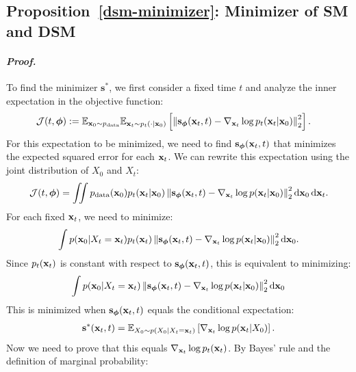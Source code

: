 \subsection{Proposition~\ref{dsm-minimizer}: Minimizer of SM and DSM}\label{app-sec:min-dsm}

\paragraph{\textit{Proof.}} To find the minimizer $\mathbf{s}^*$, we first consider a fixed time $t$ and analyze the inner expectation in the objective function:
\begin{align*}
\mathcal  J(t, \bm{\phi}) 
&:= \mathbb{E}_{{\mathbf{x}}_0 \sim p_{\text{data}}} 
\mathbb{E}_{{\mathbf{x}}_t \sim p_t(\cdot|{\mathbf{x}}_0)} 
\left[\left\| \mathbf{s}_{\bm{\phi}}({\mathbf{x}}_t, t) - \nabla_{{\mathbf{x}}_t} \log p_t({\mathbf{x}}_t|{\mathbf{x}}_0) \right\|_2^2 \right].
\end{align*}
For this expectation to be minimized, we need to find 
$\mathbf{s}_{\bm{\phi}}({\mathbf{x}}_t, t)$ 
that minimizes the expected squared error for each ${\mathbf{x}}_t$.
We can rewrite this expectation using the joint distribution of $X_0$ and $X_t$:
\begin{align*}
\mathcal J(t, \bm{\phi}) 
= \iint p_{\text{data}}({\mathbf{x}}_0) p_t({\mathbf{x}}_t |{\mathbf{x}}_0) 
\left\| \mathbf{s}_{\bm{\phi}}({\mathbf{x}}_t, t) - \nabla_{{\mathbf{x}}_t} \log p({\mathbf{x}}_t |  {\mathbf{x}}_0) \right\|_2^2 
 \mathop{}\!\mathrm{d}{\mathbf{x}}_0  \mathop{}\!\mathrm{d}{\mathbf{x}}_t.
\end{align*}
For each fixed ${\mathbf{x}}_t$, we need to minimize:
\begin{align*}
\int p({\mathbf{x}}_0 | X_t = {\mathbf{x}}_t) p_t( {\mathbf{x}}_t) 
\left\| \mathbf{s}_{\bm{\phi}}({\mathbf{x}}_t, t) - \nabla_{{\mathbf{x}}_t} \log p({\mathbf{x}}_t |  {\mathbf{x}}_0) \right\|_2^2 
 \mathop{}\!\mathrm{d}{\mathbf{x}}_0.
\end{align*}
Since $p_t({\mathbf{x}}_t)$ is constant with respect to 
$\mathbf{s}_{\bm{\phi}}({\mathbf{x}}_t, t)$, this is equivalent to minimizing:
\begin{align*}
\int p( {\mathbf{x}}_0 | X_t = {\mathbf{x}}_t) 
\left\| \mathbf{s}_{\bm{\phi}}({\mathbf{x}}_t, t) - \nabla_{{\mathbf{x}}_t} \log p({\mathbf{x}}_t |  {\mathbf{x}}_0) \right\|_2^2 
  \mathop{}\!\mathrm{d}{\mathbf{x}}_0
\end{align*}
This is minimized when $\mathbf{s}_{\bm{\phi}}({\mathbf{x}}_t, t)$ equals the conditional expectation:
\begin{align*}
\mathbf{s}^*({\mathbf{x}}_t, t) 
= \mathbb{E}_{X_0 \sim p(X_0 | X_t = {\mathbf{x}}_t)} 
\left[ \nabla_{{\mathbf{x}}_t} \log p({\mathbf{x}}_t | X_0) \right].
\end{align*}
Now we need to prove that this equals 
$\nabla_{{\mathbf{x}}_t} \log p_t({\mathbf{x}}_t)$. By Bayes' rule and the definition of marginal probability:

